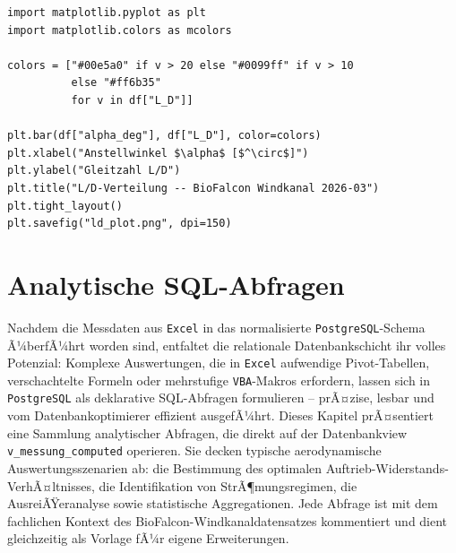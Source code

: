﻿\documentclass[12pt,a4paper]{report}
\theoremstyle{definition}
\theoremstyle{remark}
\newcommand{\excel}{\texttt{Excel}}
\newcommand{\vba}{\texttt{VBA}}
\newcommand{\pg}{\texttt{PostgreSQL}}
\newcommand{\code}[1]{\texttt{#1}}
\begin{document}
\begin{lstlisting}[style=python, caption={Python-\"Aquivalent: matplotlib Farbkodierung}]
import matplotlib.pyplot as plt
import matplotlib.colors as mcolors

colors = ["#00e5a0" if v > 20 else "#0099ff" if v > 10
          else "#ff6b35"
          for v in df["L_D"]]

plt.bar(df["alpha_deg"], df["L_D"], color=colors)
plt.xlabel("Anstellwinkel $\alpha$ [$^\circ$]")
plt.ylabel("Gleitzahl L/D")
plt.title("L/D-Verteilung -- BioFalcon Windkanal 2026-03")
plt.tight_layout()
plt.savefig("ld_plot.png", dpi=150)
\end{lstlisting}

\chapter{Analytische SQL-Abfragen}

Nachdem die Messdaten aus \excel{} in das normalisierte \pg{}-Schema Ã¼berfÃ¼hrt worden sind, entfaltet die relationale Datenbankschicht ihr volles Potenzial: Komplexe Auswertungen, die in \excel{} aufwendige Pivot-Tabellen, verschachtelte Formeln oder mehrstufige \vba{}-Makros erfordern, lassen sich in \pg{} als deklarative SQL-Abfragen formulieren -- prÃ¤zise, lesbar und vom Datenbankoptimierer effizient ausgefÃ¼hrt. Dieses Kapitel prÃ¤sentiert eine Sammlung analytischer Abfragen, die direkt auf der Datenbankview \code{v\_messung\_computed} operieren. Sie decken typische aerodynamische Auswertungsszenarien ab: die Bestimmung des optimalen Auftrieb-Widerstands-VerhÃ¤ltnisses, die Identifikation von StrÃ¶mungsregimen, die AusreiÃŸeranalyse sowie statistische Aggregationen. Jede Abfrage ist mit dem fachlichen Kontext des BioFalcon-Windkanaldatensatzes kommentiert und dient gleichzeitig als Vorlage fÃ¼r eigene Erweiterungen.
\end{document}
